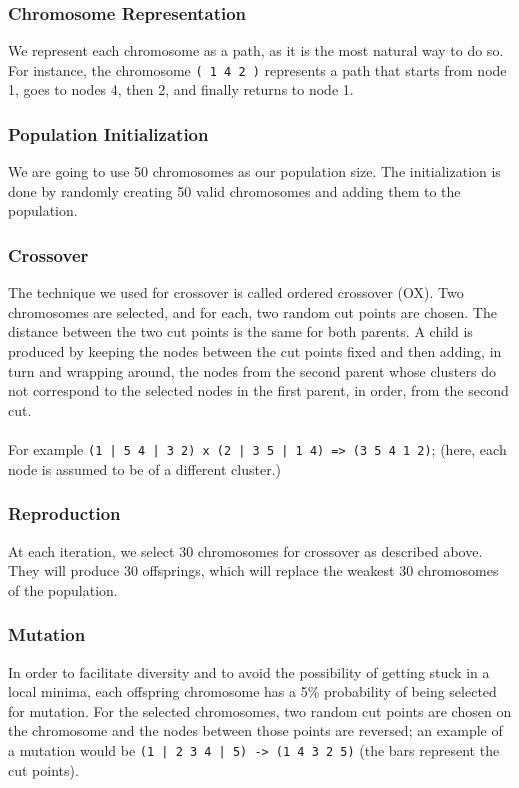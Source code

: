 \documentclass[a4paper, 10pt]{report}
\begin{document}
\subsubsection{Chromosome Representation}
We represent each chromosome as a path, as it is the most natural way to do so. For instance, the chromosome \texttt{( 1 4 2 )} represents a path that starts from node 1, goes to nodes 4, then 2, and finally returns to node 1.
\subsubsection{Population Initialization}
We are going to use 50 chromosomes as our population size. The initialization is done by randomly creating 50 valid chromosomes and adding them to the population. 
\subsubsection{Crossover}
The technique we used for crossover is called ordered crossover (OX). Two chromosomes are selected, and for each, two random cut points are chosen. The distance between the two cut points is the same for both parents. A child is produced by keeping the nodes between the cut points fixed and then adding, in turn and wrapping around, the nodes from the second parent whose clusters do not correspond to the selected nodes in the first parent, in order, from the second cut.\\\\
For example \texttt{(1 | 5 4 | 3 2) x (2 | 3 5 | 1 4) => (3 5 4 1 2)}; (here, each node is assumed to be of a different cluster.)
\subsubsection{Reproduction}
At each iteration, we select 30 chromosomes for crossover as described above. They will produce 30 offsprings, which will replace the weakest 30 chromosomes of the population.
\subsubsection{Mutation}
In order to facilitate diversity and to avoid the possibility of getting stuck in a local minima, each offspring chromosome has a 5\% probability of being selected for mutation. For the selected chromosomes, two random cut points are chosen on the chromosome and the nodes between those points are reversed; an example of a mutation would be \texttt{(1 | 2 3 4 | 5) -> (1 4 3 2 5)} (the bars represent the cut points).
\end{document}
